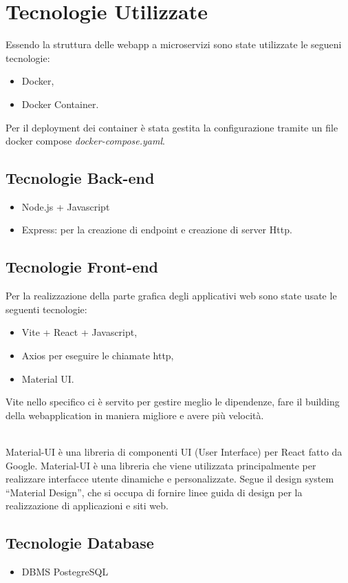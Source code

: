 \section{Tecnologie Utilizzate}
Essendo la struttura delle webapp a microservizi  sono state utilizzate le segueni tecnologie:
\begin{itemize}
    \item Docker,
    \item Docker Container.
\end{itemize}

Per il deployment dei container è stata gestita la configurazione tramite un file docker compose \textit{docker-compose.yaml}.
\subsection{Tecnologie Back-end}
\begin{itemize}
    \item Node.js + Javascript
    \item Express: per la creazione di endpoint e creazione di server Http. 
\end{itemize}

\subsection{Tecnologie Front-end}
Per la realizzazione della parte grafica degli applicativi web sono state usate le seguenti tecnologie:
\begin{itemize}
    \item Vite + React + Javascript,
    \item Axios per eseguire le chiamate http,
    \item Material UI.
\end{itemize}

Vite nello specifico ci è servito per gestire meglio le dipendenze, fare il building della webapplication in maniera migliore e avere più velocità. \\\

Material-UI è una libreria di componenti UI (User Interface) per React fatto da Google. Material-UI è una libreria che viene utilizzata principalmente per realizzare interfacce utente dinamiche e personalizzate.
Segue il design system “Material Design”, che si occupa di fornire linee guida di design per la realizzazione di applicazioni e siti web.\\

\subsection{Tecnologie Database}
\begin{itemize}
    \item DBMS PostegreSQL
\end{itemize}



